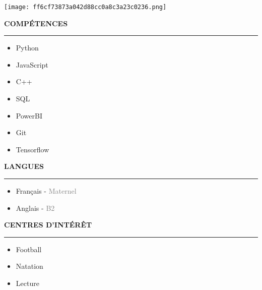 \documentclass{article}
\newcommand{\cvsection}[1]{%
  \par\bigskip
  {\Large\bfseries #1}\par
  \noindent\rule{\linewidth}{0.6pt}\par
  \medskip
}
\begin{document}
\begin{paracol}{2}
\switchcolumn
\color{black}           %

\centering
\texttt{[image: ff6cf73873a042d88cc0a8c3a23c0236.png]}

\bigskip

\cvsection{COMPÉTENCES}

\begin{itemize}[leftmargin=*]
\item Python
\item JavaScript
\item C++
\item SQL
\item PowerBI
\item Git
\item Tensorflow\end{itemize}


\cvsection{LANGUES}

\begin{itemize}[leftmargin=*]
\item Français - \textcolor{gray}{Maternel}
\item Anglais - \textcolor{gray}{B2}\end{itemize}


\cvsection{CENTRES D’INTÉRÊT}

\begin{itemize}[leftmargin=*]
\item Football
\item Natation
\item Lecture
\end{itemize}


\end{paracol}
\end{document}
